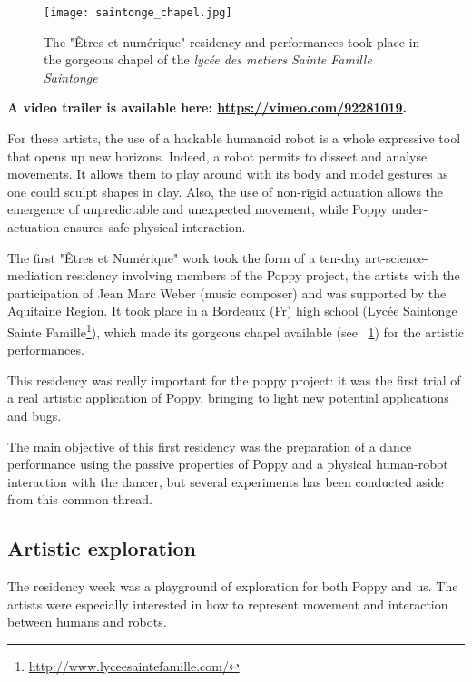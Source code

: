 \begin{figure}[tb]
    \begin{center}
        \texttt{[image: saintonge\_chapel.jpg]}
    \end{center}
    \caption{The "Êtres et numérique" residency and performances took place in the gorgeous chapel of the \emph{lycée des metiers Sainte Famille Saintonge}}
    \label{fig:saintonge_chapel}
\end{figure}

\textbf{A video trailer is available here: \url{https://vimeo.com/92281019}.}

For these artists, the use of a hackable humanoid robot is a whole expressive tool that opens up new horizons. Indeed, a robot permits to dissect and analyse movements. It allows them to play around with its body and model gestures as one could sculpt shapes in clay. Also, the use of non-rigid actuation allows the emergence of unpredictable and unexpected movement, while Poppy under-actuation ensures safe physical interaction.


The first "Êtres et Numérique" work took the form of a ten-day art-science-mediation residency involving members of the Poppy project, the artists with the participation of Jean Marc Weber (music composer) and was supported by the Aquitaine Region. It took place in a Bordeaux (Fr) high school (Lycée Saintonge Sainte Famille\footnote{\url{http://www.lyceesaintefamille.com/}}), which made its gorgeous chapel available (see \figurename~\ref{fig:saintonge_chapel}) for the artistic performances.


This residency was really important for the poppy project: it was the first trial of a real artistic application of Poppy, bringing to light new potential applications and bugs.

The main objective of this first residency was the preparation of a dance performance using the passive properties of Poppy and a physical human-robot interaction with the dancer, but several experiments has been conducted aside from this common thread.


\subsection{Artistic exploration} %

The residency week was a playground of exploration for both Poppy and us. The artists were especially interested in how to represent movement and interaction between humans and robots.

